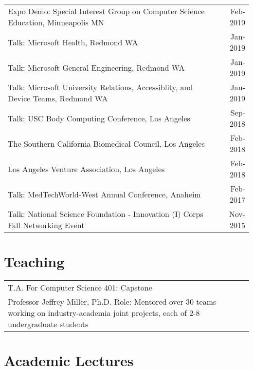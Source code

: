 \documentclass[10pt,a4paper]{article}
\begin{document}
  \vspace*{1mm}\noindent\begin{tabularx}{17cm}{X r}
    Expo Demo: Special Interest Group on Computer Science Education, Minneapolis MN & Feb-2019\\ %
    Talk: Microsoft Health, Redmond WA & Jan-2019\\
    Talk: Microsoft General Engineering, Redmond WA & Jan-2019\\
    Talk: Microsoft University Relations, Accessiblity, and Device Teams, Redmond WA & Jan-2019\\
    Talk: USC Body Computing Conference, Los Angeles & Sep-2018\\ %
    The Southern California Biomedical Council, Los Angeles & Feb-2018 \\ %
    Los Angeles Venture Association, Los Angeles & Feb-2018 \\%
    Talk: MedTechWorld-West Annual Conference, Anaheim & Feb-2017\\ %
    Talk: National Science Foundation - Innovation (I) Corps Fall Networking Event & Nov-2015\\
  \end{tabularx}

\vspace*{2mm}\section*{Teaching}

  \vspace*{1mm}\noindent\begin{tabularx}{17cm}{X r}
    T.A. For Computer Science 401: Capstone & \multirow{3}{*}{}{Spring-2018} \\
    Professor Jeffrey Miller, Ph.D.
    Role: Mentored over 30 teams working on industry-academia joint projects, each of 2-8 undergraduate students\\[2mm]
\end{tabularx}


  \vspace*{2mm}\section*{Academic Lectures}
\end{document}
